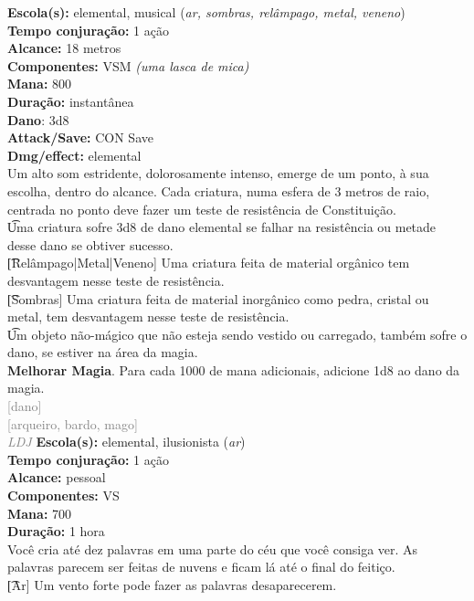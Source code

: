 \documentclass{RPG_Adventure}[2021/10/20]
\begin{document}
{\small \t \textbf{Escola(s):} elemental, musical (\textit{ar, sombras, relâmpago, metal, veneno})\\\t \textbf{Tempo conjuração:} 1 ação\\\t \textbf{Alcance:} 18 metros\\\t \textbf{Componentes:} VSM \textit{(uma lasca de mica)}\\\t \textbf{Mana:} 800\\\t \textbf{Duração:} instantânea\\\t \textbf{Dano}: 3d8\\\t \textbf{Attack/Save:} CON Save\\\t \textbf{Dmg/effect:} elemental\\}
{\normalsize Um alto som estridente, dolorosamente intenso, emerge de um ponto, à sua escolha, dentro do alcance. Cada criatura, numa esfera de 3 metros de raio, centrada no ponto deve fazer um teste de resistência de Constituição.\\\t Uma criatura sofre 3d8 de dano elemental se falhar na resistência ou metade desse dano se obtiver sucesso.\\\t [Relâmpago|Metal|Veneno] Uma criatura feita de material orgânico tem desvantagem nesse teste de resistência.\\\t [Sombras] Uma criatura feita de material inorgânico como pedra, cristal ou metal, tem desvantagem nesse teste de resistência.\\\t Um objeto não-mágico que não esteja sendo vestido ou carregado, também sofre o dano, se estiver na área da magia.\\\t \textbf{Melhorar Magia}. Para cada 1000 de mana adicionais, adicione 1d8 ao dano da magia.\\}
{\scriptsize \textcolor{gray}{[dano]\\}}
{\scriptsize \textcolor{gray}{[arqueiro, bardo, mago]\\}}
{\tiny \textcolor{gray}{\textit{LDJ}}}\jump{}
{\small \t \textbf{Escola(s):} elemental, ilusionista (\textit{ar})\\\t \textbf{Tempo conjuração:} 1 ação\\\t \textbf{Alcance:} pessoal\\\t \textbf{Componentes:} VS\\\t \textbf{Mana:} 700\\\t \textbf{Duração:} 1 hora\\}
{\normalsize Você cria até dez palavras em uma parte do céu que você consiga ver. As palavras parecem ser feitas de nuvens e ficam lá até o final do feitiço.\\\t [Ar] Um vento forte pode fazer as palavras desaparecerem.\\}
\end{document}
